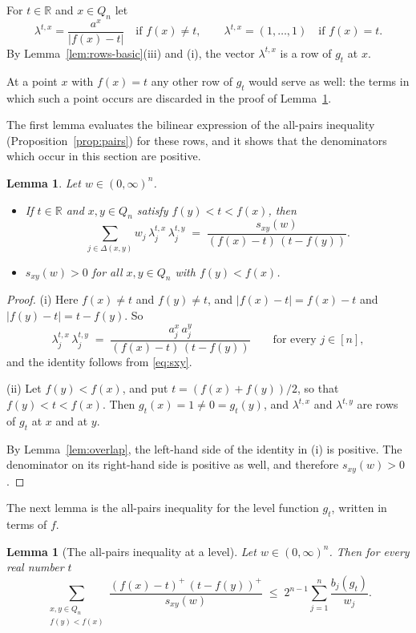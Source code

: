 \documentclass[11pt,reqno]{amsart}
\newtheorem{lemma}[theorem]{Lemma}
\theoremstyle{definition}
\theoremstyle{remark}
\numberwithin{equation}{section}
\theoremstyle{named}
\theoremstyle{plain}
\newcommand{\R}{\mathbb{R}}
\newcommand{\abs}[1]{\lvert #1\rvert}
\begin{document}
For $t\in\R$ and $x\in Q_n$ let
\[
   \lambda^{t,x}=\frac{a^{x}}{\abs{f(x)-t}}\quad\text{if }f(x)\ne t,\qquad
   \lambda^{t,x}=(1,\dots,1)\quad\text{if }f(x)=t .
\]
By Lemma~\ref{lem:rows-basic}(iii) and (i), the vector $\lambda^{t,x}$ is a row of $g_t$ at $x$.

At
a point $x$ with $f(x)=t$ any other row of $g_t$ would serve as well: the terms in which such a
point occurs are discarded in the proof of Lemma~\ref{lem:level-pairs}.

The first lemma evaluates the bilinear expression of the all-pairs inequality (Proposition~\ref{prop:pairs}) for these rows, and
it shows that the denominators which occur in this section are positive.

\begin{lemma}\label{lem:level-rows}
Let $w\in(0,\infty)^{n}$.
\begin{itemize}
\item[\textup{(i)}] If $t\in\R$ and $x,y\in Q_n$ satisfy $f(y)<t<f(x)$, then
\[
   \sum_{j\in\Delta(x,y)}w_j\,\lambda^{t,x}_j\,\lambda^{t,y}_j
   \;=\;\frac{s_{xy}(w)}{(f(x)-t)\,(t-f(y))} .
\]
\item[\textup{(ii)}] $s_{xy}(w)>0$ for all $x,y\in Q_n$ with $f(y)<f(x)$.
\end{itemize}
\end{lemma}

\begin{proof}
(i) Here $f(x)\ne t$ and $f(y)\ne t$, and $\abs{f(x)-t}=f(x)-t$ and $\abs{f(y)-t}=t-f(y)$. So
\[
   \lambda^{t,x}_j\,\lambda^{t,y}_j\;=\;\frac{a^{x}_j\,a^{y}_j}{(f(x)-t)\,(t-f(y))}
   \qquad\text{for every }j\in[n],
\]
and the identity follows from \eqref{eq:sxy}.

(ii) Let $f(y)<f(x)$, and put $t=(f(x)+f(y))/2$, so that $f(y)<t<f(x)$. Then
$g_t(x)=1\ne0=g_t(y)$, and $\lambda^{t,x}$ and $\lambda^{t,y}$ are rows of $g_t$ at $x$ and at $y$.

By Lemma~\ref{lem:overlap}, the left-hand side of the identity in (i) is positive. The denominator
on its right-hand side is positive as well, and therefore $s_{xy}(w)>0$.
\end{proof}

The next lemma is the all-pairs inequality for the level function $g_t$, written in terms of $f$.

\begin{lemma}[The all-pairs inequality at a level]\label{lem:level-pairs}
Let $w\in(0,\infty)^{n}$. Then for every real number $t$
\begin{equation}\label{eq:level-pairs}
   \sum_{\substack{x,y\in Q_n\\ f(y)<f(x)}}\frac{(f(x)-t)^{+}\,(t-f(y))^{+}}{s_{xy}(w)}
   \;\le\;2^{n-1}\sum_{j=1}^{n}\frac{b_j(g_t)}{w_j}.
\end{equation}
\end{lemma}
\end{document}
